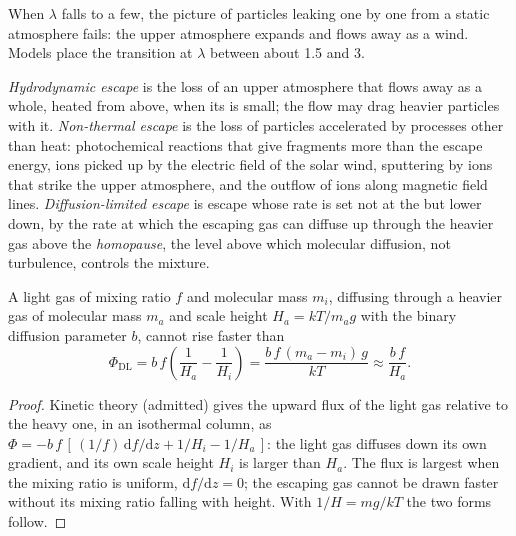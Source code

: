 
When $\lambda$ falls to a few, the picture of particles leaking one by one
from a static atmosphere fails: the upper atmosphere expands and flows
away as a wind. Models place the transition at $\lambda$ between about 1.5
and 3.

\begin{definition}\label{def:b3:planetary-atmospheres:hydrodynamic}
\emph{Hydrodynamic escape} is the loss of an
upper atmosphere that flows away as a whole, heated from above, when its
 is small; the flow may drag heavier particles with it.
\emph{Non-thermal escape} is the loss of
particles accelerated by processes other than heat: photochemical
reactions that give fragments more than the escape energy, ions picked up
by the electric field of the solar wind, sputtering by ions that strike
the upper atmosphere, and the outflow of ions along magnetic field lines.
\emph{Diffusion-limited escape} is escape
whose rate is set not at the  but lower down, by the rate at which
the escaping gas can diffuse up through the heavier gas above the
\emph{homopause}, the level above which molecular
diffusion, not turbulence, controls the mixture.
\end{definition}

\begin{proposition}\label{prop:b3:planetary-atmospheres:diffusion}
A light gas of mixing ratio $f$ and molecular mass $m_i$, diffusing
through a heavier gas of molecular mass $m_a$ and scale height $H_a =
kT/m_a g$ with the binary diffusion parameter $b$, cannot rise faster
than
\[
\Phi_\mathrm{DL} = b\,f\left(\frac1{H_a} - \frac1{H_i}\right)
= \frac{b\,f\,(m_a - m_i)\,g}{kT} \approx \frac{b\,f}{H_a}.
\]
\end{proposition}

\begin{proof}
Kinetic theory (admitted) gives the upward flux of the light gas
relative to the heavy one, in an isothermal column, as $\Phi = -b\,f\,
[\,(1/f)\,\mathrm df/\mathrm dz + 1/H_i - 1/H_a\,]$: the light gas
diffuses down its own gradient, and its own scale height $H_i$ is larger
than $H_a$. The flux is largest when the mixing ratio is uniform, $\mathrm
df/\mathrm dz = 0$; the escaping gas cannot be drawn faster without its
mixing ratio falling with height. With $1/H = mg/kT$ the two forms
follow.
\end{proof}

